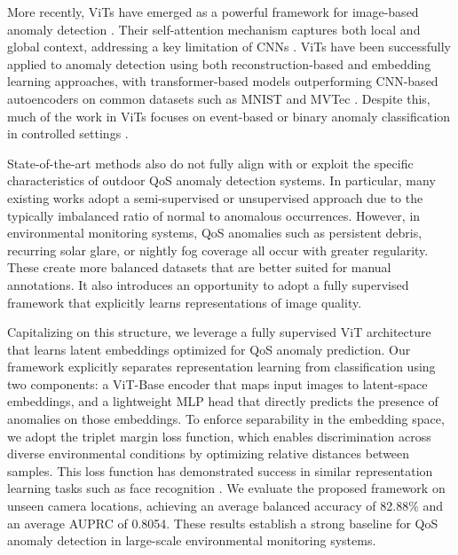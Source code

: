 \documentclass[remotesensing,article,submit,moreauthors]{Definitions/mdpi}
\begin{document}
More recently, \ac{ViT}s have emerged as a powerful framework for image-based anomaly detection \cite{mishra2021vt, yang2024unsupervised}. Their self-attention mechanism captures both local and global context, addressing a key limitation of \ac{CNNs} \cite{lee2022anovit}. \ac{ViT}s have been successfully applied to anomaly detection using both reconstruction-based and embedding learning approaches, with transformer-based models outperforming CNN-based autoencoders on common datasets such as MNIST and MVTec \cite{mishra2021vt}. Despite this, much of the work in \ac{ViT}s focuses on event-based or binary anomaly classification in controlled settings \cite{choi2022viv, yang2024unsupervised}. 

State-of-the-art methods also do not fully align with or exploit the specific characteristics of outdoor \ac{QoS} anomaly detection systems. In particular, many existing works adopt a semi-supervised or unsupervised approach due to the typically imbalanced ratio of normal to anomalous occurrences. However, in environmental monitoring systems, \ac{QoS} anomalies such as persistent debris, recurring solar glare, or nightly fog coverage all occur with greater regularity. These create more balanced datasets that are better suited for manual annotations. It also introduces an opportunity to adopt a fully supervised framework that explicitly learns representations of image quality. 

Capitalizing on this structure, we leverage a fully supervised \ac{ViT} architecture that learns latent embeddings optimized for \ac{QoS} anomaly prediction. Our framework explicitly separates representation learning from classification using two components: a \ac{ViT}-Base encoder that maps input images to latent-space embeddings, and a lightweight \ac{MLP} head that directly predicts the presence of anomalies on those embeddings. To enforce separability in the embedding space, we adopt the triplet margin loss function, which enables discrimination across diverse environmental conditions by optimizing relative distances between samples. This loss function has demonstrated success in similar representation learning tasks such as face recognition \cite{Schroff_2015_CVPR}. We evaluate the proposed framework on unseen camera locations, achieving an average balanced accuracy of 82.88\% and an average \ac{AUPRC} of 0.8054. These results establish a strong baseline for \ac{QoS} anomaly detection in large-scale environmental monitoring systems. 

\end{document}
